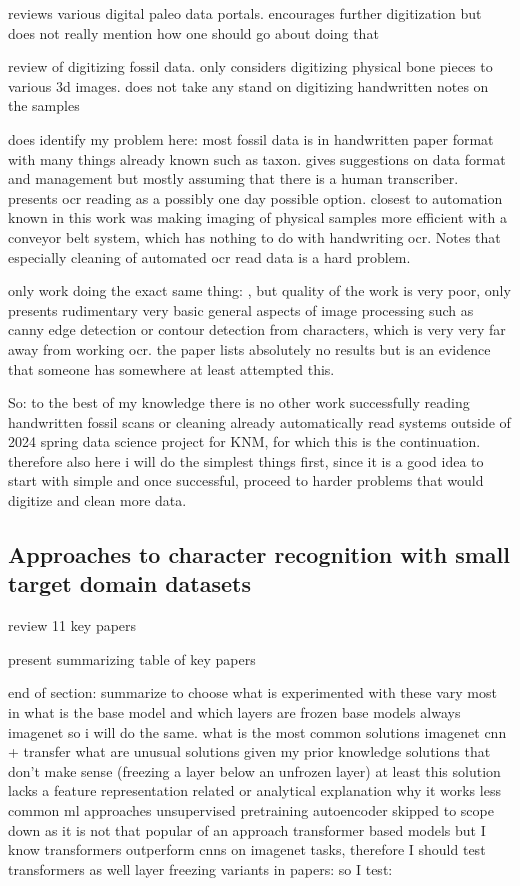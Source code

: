 \documentclass{article}
\begin{document}
\cite{uhenCardCatalogsComputers2013} reviews various digital paleo data portals. encourages further digitization but 
does not really mention how one should go about doing that

\cite{mallisonDigitizingMethodsPaleontology2011} review of digitizing fossil data. only considers digitizing 
physical bone pieces to various 3d images. does not take any stand on digitizing handwritten notes on the samples 

\cite{groomImprovedStandardizationTranscribed2019} does identify my problem here: most fossil data is in handwritten paper 
format with many things already known such as taxon. gives suggestions on data format and management but mostly assuming 
that there is a human transcriber. presents ocr reading as a possibly one day possible option. closest to automation 
known in this work was making imaging of physical samples more efficient with a conveyor belt system, which has nothing to 
do with handwriting ocr. Notes that especially cleaning of automated ocr read data is a hard problem.

only work doing the exact same thing: \cite{shanmugavelHandwrittenOpticalCharacter2018}, but quality of the work is very poor, only 
presents rudimentary very basic general aspects of image processing such as canny edge detection or contour detection from characters, 
which is very very far away from working ocr. the paper lists absolutely no results but is an evidence that someone has somewhere at least 
attempted this.

So: to the best of my knowledge there is no other work successfully reading handwritten fossil scans or cleaning 
already automatically read systems outside of 2024 spring data science project for KNM, for which this is the 
continuation. therefore also here i will do the simplest things first, since it is a good idea to start with simple and 
once successful, proceed to harder problems that would digitize and clean more data.

\subsection{Approaches to character recognition with small target domain datasets}

review 11 key papers 

present summarizing table of key papers

end of section: summarize to choose what is experimented with
these vary most in what is the base model and which layers are frozen
base models
always imagenet so i will do the same.
what is the most common solutions
    imagenet cnn + transfer
what are unusual solutions given my prior knowledge
    solutions that don't make sense (freezing a layer below an unfrozen layer)
        at least this solution lacks a feature representation related or analytical explanation why it works
    less common ml approaches
        unsupervised pretraining
            autoencoder skipped to scope down as it is not that popular of an approach
        transformer based models
            but I know transformers outperform cnns on imagenet tasks, therefore I should test transformers as well
layer freezing 
    variants in papers:
    so I test:
\end{document}

